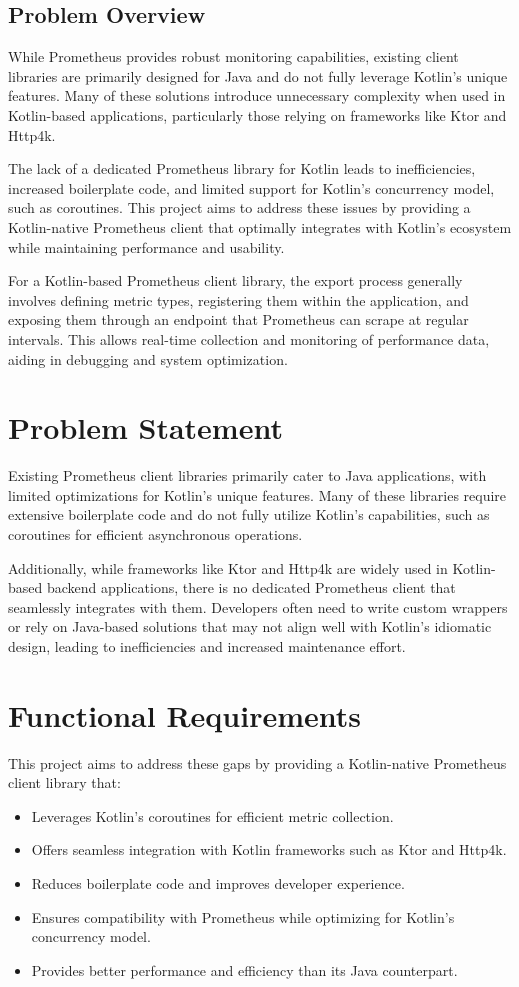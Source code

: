 \documentclass[a4paper,twoside,11pt]{article}
\begin{document}
\subsection{Problem Overview}
While Prometheus provides robust monitoring capabilities, existing client libraries are primarily designed for Java and do not fully leverage Kotlin’s unique features. Many of these solutions introduce unnecessary complexity when used in Kotlin-based applications, particularly those relying on frameworks like Ktor and Http4k.  

The lack of a dedicated Prometheus library for Kotlin leads to inefficiencies, increased boilerplate code, and limited support for Kotlin's concurrency model, such as coroutines. This project aims to address these issues by providing a Kotlin-native Prometheus client that optimally integrates with Kotlin's ecosystem while maintaining performance and usability.


For a Kotlin-based Prometheus client library, the export process generally involves defining metric types, registering them within the application, and exposing them through an endpoint that Prometheus can scrape at regular intervals. This allows real-time collection and monitoring of performance data, aiding in debugging and system optimization.

\section{Problem Statement}
Existing Prometheus client libraries primarily cater to Java applications, with limited optimizations for Kotlin’s unique features. Many of these libraries require extensive boilerplate code and do not fully utilize Kotlin’s capabilities, such as coroutines for efficient asynchronous operations.

Additionally, while frameworks like Ktor and Http4k are widely used in Kotlin-based backend applications, there is no dedicated Prometheus client that seamlessly integrates with them. Developers often need to write custom wrappers or rely on Java-based solutions that may not align well with Kotlin’s idiomatic design, leading to inefficiencies and increased maintenance effort.

\section{Functional Requirements}
This project aims to address these gaps by providing a Kotlin-native Prometheus client library that:
\begin{itemize}
    \item Leverages Kotlin’s coroutines for efficient metric collection.
    \item Offers seamless integration with Kotlin frameworks such as Ktor and Http4k.
    \item Reduces boilerplate code and improves developer experience.
    \item Ensures compatibility with Prometheus while optimizing for Kotlin’s concurrency model.
    \item Provides better performance and efficiency than its Java counterpart.
\end{itemize}
\end{document}

